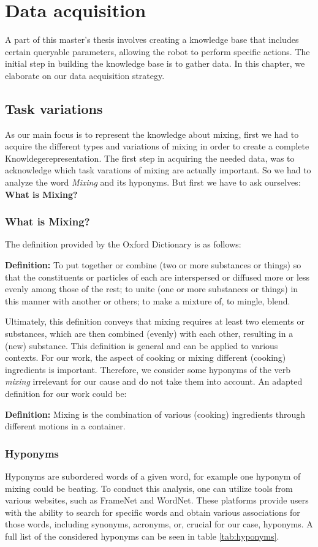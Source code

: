 \chapter{Data acquisition}

A part of this master's thesis involves creating a knowledge base that includes certain queryable parameters, allowing the robot to perform specific actions. The initial step in building the knowledge base is to gather data. In this chapter, we elaborate on our data acquisition strategy.
\section{Task variations}
	As our main focus is to represent the knowledge about mixing, first we had to acquire the different types and variations of mixing in order to create a complete Knowldegerepresentation. The first step in acquiring the needed data, was to acknowledge which task varations of mixing are actually important. 
  So we had to analyze the word \textit{Mixing} and its hyponyms. But first we have to ask ourselves: \textbf{What is Mixing?}
  \subsection*{What is Mixing?}
  The definition provided by the Oxford Dictionary \cite{Oxford} is as follows:
  
  \textbf{Definition:} To put together or combine (two or more substances or things) so that the constituents or particles of each are interspersed or diffused more or less evenly among those of the rest; to unite (one or more substances or things) in this manner with another or others; to make a mixture of, to mingle, blend.

  Ultimately, this definition conveys that mixing requires at least two elements or substances, which are then combined (evenly) with each other, resulting in a (new) substance.
  This definition is general and can be applied to various contexts. For our work, the aspect of cooking or mixing different (cooking) ingredients is important. Therefore, we consider some hyponyms of the verb \textit{mixing} irrelevant for our cause and do not take them into account.
  An adapted definition for our work could be: 
  
  \textbf{Definition:} Mixing is the combination of various (cooking) ingredients through different motions in a container.
  
  \subsection{Hyponyms} 
	Hyponyms are subordered words of a given word, for example one hyponym of mixing could be beating. 
  To conduct this analysis, one can utilize tools from various websites, such as FrameNet\cite{FrameNet} and WordNet\cite{WordNet}. These platforms provide users with the ability to search for specific words and obtain various associations for those words, including synonyms, acronyms, or, crucial for our case, hyponyms.	
  A full list of the considered hyponyms can be seen in table \ref{tab:hyponyms}.
